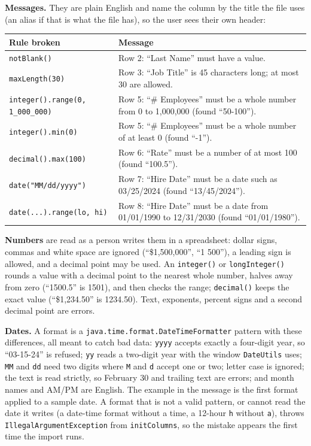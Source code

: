 \textbf{Messages.}  They are plain English and name the column by the title the file uses (an alias if that is what the file has), so the user sees their own header:

\begin{longtable}{P{4.4cm}P{6.2cm}}
\toprule
\textbf{Rule broken} & \textbf{Message} \\
\midrule
\endhead
\texttt{notBlank()} & Row 2: ``Last Name'' must have a value. \\
\texttt{maxLength(30)} & Row 3: ``Job Title'' is 45 characters long; at most 30 are allowed. \\
\texttt{integer().range(0, 1\_000\_000)} & Row 5: ``\# Employees'' must be a whole number from 0 to 1,000,000 (found ``50-100''). \\
\texttt{integer().min(0)} & Row 5: ``\# Employees'' must be a whole number of at least 0 (found ``-1''). \\
\texttt{decimal().max(100)} & Row 6: ``Rate'' must be a number of at most 100 (found ``100.5''). \\
\texttt{date("MM/dd/yyyy")} & Row 7: ``Hire Date'' must be a date such as 03/25/2024 (found ``13/45/2024''). \\
\texttt{date(...).range(lo, hi)} & Row 8: ``Hire Date'' must be a date from 01/01/1990 to 12/31/2030 (found ``01/01/1980''). \\
\bottomrule
\end{longtable}

\textbf{Numbers} are read as a person writes them in a spreadsheet: dollar signs, commas and white space are ignored (``\$1,500,000'', ``1 500''), a leading sign is allowed, and a decimal point may be used.  An \texttt{integer()} or \texttt{longInteger()} rounds a value with a decimal point to the nearest whole number, halves away from zero (``1500.5'' is 1501), and then checks the range; \texttt{decimal()} keeps the exact value (``\$1,234.50'' is 1234.50).  Text, exponents, percent signs and a second decimal point are errors.

\textbf{Dates.}  A format is a \texttt{java.time.format.DateTimeFormatter} pattern with these differences, all meant to catch bad data: \texttt{yyyy} accepts exactly a four-digit year, so ``03-15-24'' is refused; \texttt{yy} reads a two-digit year with the window \texttt{DateUtils} uses; \texttt{MM} and \texttt{dd} need two digits where \texttt{M} and \texttt{d} accept one or two; letter case is ignored; the text is read strictly, so February 30 and trailing text are errors; and month names and AM/PM are English.  The example in the message is the first format applied to a sample date.  A format that is not a valid pattern, or cannot read the date it writes (a date-time format without a time, a 12-hour \texttt{h} without \texttt{a}), throws \texttt{IllegalArgumentException} from \texttt{initColumns}, so the mistake appears the first time the import runs.

